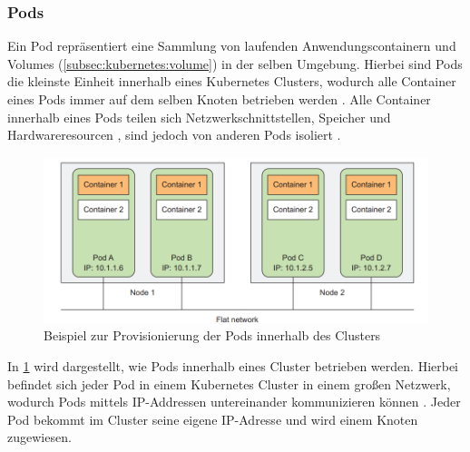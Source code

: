 \subsubsection{Pods}
\label{subsec:kubernetes:pods}
Ein Pod repräsentiert eine Sammlung von laufenden Anwendungscontainern 
und Volumes (\ref{subsec:kubernetes:volume}) in der selben Umgebung.
Hierbei sind Pods die kleinste Einheit innerhalb eines Kubernetes Clusters, wodurch alle Container eines Pods
immer auf dem selben Knoten betrieben werden \cite{Burns2019}.
Alle Container innerhalb eines Pods teilen sich Netzwerkschnittstellen, Speicher und Hardwareresourcen \cite{kubernetesPods},
sind jedoch von anderen Pods isoliert \cite{Burns2019}.

\begin{figure}[h]
  \includegraphics[width=\textwidth]{gfx/chapters/2_grundlagen/kubernetes_network.png}
  \caption{Beispiel zur Provisionierung der Pods innerhalb des Clusters}
  \label{fig:kubernetes_network}
\end{figure}

In \ref{fig:kubernetes_network} wird dargestellt, wie Pods innerhalb eines Cluster betrieben werden.
Hierbei befindet sich jeder Pod in einem Kubernetes Cluster in einem großen Netzwerk, wodurch Pods mittels IP-Addressen untereinander 
kommunizieren können \cite{Marko2018}. Jeder Pod bekommt im Cluster seine eigene IP-Adresse und wird einem Knoten zugewiesen.


